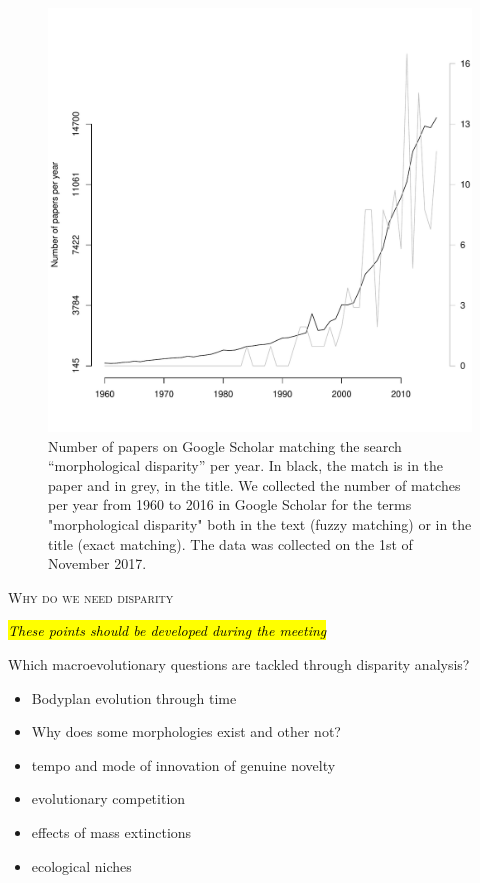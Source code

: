 \documentclass[12pt,letterpaper]{article}
\renewcommand{\section}[1]{%
\bigskip
\begin{center}
\begin{Large}
\normalfont\scshape #1
\medskip
\end{Large}
\end{center}}
\begin{document}
\begin{figure}[!htbp]
\centering
   \includegraphics[width=1\textwidth]{Figures/GoogleScholarOccurences.pdf} 
\caption{Number of papers on Google Scholar matching the search ``morphological disparity'' per year. In black, the match is in the paper and in grey, in the title. We collected the number of matches per year from 1960 to 2016 in Google Scholar for the terms "morphological disparity" both in the text (fuzzy matching) or in the title (exact matching). The data was collected on the 1st of November 2017.}
\label{Fig:GoogleOccurences}
\end{figure}


\section{Why do we need disparity}

\noindent \hl{\textit{These points should be developed during the meeting}}


Which macroevolutionary questions are tackled through disparity analysis?
\begin{itemize}
    \item Bodyplan evolution through time
    \item Why does some morphologies exist and other not?
    \item tempo and mode of innovation of genuine novelty
    \item evolutionary competition
    \item effects of mass extinctions
    \item ecological niches
\end{itemize}
\end{document}
